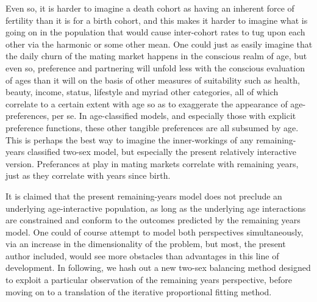 Even so, it is harder to imagine a death cohort as having an inherent 
force of fertility than it is for a birth cohort, and this makes it harder to 
imagine what is going on in the population that would cause inter-cohort rates 
to tug upon each other via the harmonic or some other mean. One could just as
easily imagine that the daily churn of the mating market happens in the
conscious realm of age, but even so, preference and partnering will unfold less
with the conscious evaluation of ages than it will on the basis of other
measures of suitability such as health, beauty, income, status, lifestyle and
myriad other categories, all of which correlate to a certain extent with age so
as to exaggerate the appearance of age-preferences, per se. In age-classified
models, and especially those with explicit preference functions, these other
tangible preferences are all subsumed by age. This is perhaps the best way to
imagine the inner-workings of any remaining-years classified two-sex model, but
especially the present relatively interactive version. Preferances at play in
mating markets correlate with remaining years, just as they correlate with years
since birth.

It is claimed that the present remaining-years model does not preclude an
underlying age-interactive population, as long as the underlying age
interactions are constrained and conform to the outcomes predicted by the
remaining years model. One could of course attempt to model both perspectives
simultaneously, via an increase in the dimensionality of the problem, but most,
the present author included, would see more obstacles than advantages in this
line of development. In following, we hash out a new two-sex balancing method
designed to exploit a particular observation of the remaining years
perspective, before moving on to a translation of the iterative proportional fitting method.

\FloatBarrier